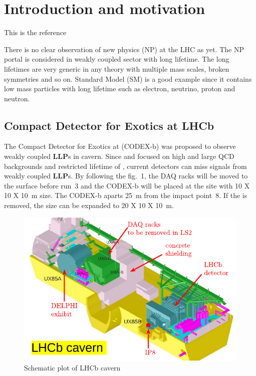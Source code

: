 \section{Introduction and motivation}
\label{sec:Introduction}

This is the reference~\cite{Gligorov:2017nwh}

There is no clear observation of new physics (NP) at the LHC as yet. The NP portal is considered in weakly coupled sector with long lifetime. 
The long lifetimes are very generic in any theory with multiple mass scales, broken symmetries and so on. 
Standard Model (SM) is a good example since it contains low mass particles with long lifetime such as electron, neutrino, proton and neutron.

\subsection{Compact Detector for Exotics at LHCb}

The Compact Detector for Exotics at \lhcb (CODEX-b) was proposed to observe weakly coupled \textbf{LLP}s in \lhcb cavern. 
Since \atlas and \cms focused on high \pt and large QCD backgrounds and restricted lifetime of \lhcb, current detectors can miss signals from weakly coupled \textbf{LLP}s. 
By following the fig.~1, the DAQ racks will be moved to the surface before run~3 and the CODEX-b will be placed at the site with 10 X 10 X 10~m size. 
The CODEX-b aparts 25~m from the impact point~8. 
If the \delphi is removed, the size can be expanded to 20 X 10 X 10~m.

\begin{figure}[h]
\centering
    \includegraphics[width=12cm]{figs/INT/lhcb_cavern.pdf}
    \vspace{0.15cm}
\caption{ 
   Schematic plot of LHCb cavern 
}
\end{figure}
